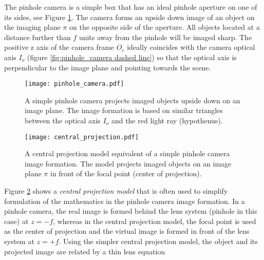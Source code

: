 \documentclass[12pt,a4paper,oneside,pdftex]{report}
\begin{document}
{%

The pinhole camera is a simple box that has an ideal pinhole aperture on one of its sides, see Figure \ref{fig:pinhole_camera}. The camera forms an upside down image of an object on the imaging plane $\pi$ on the opposite side of the aperture. All objects located at a distance further than $f$ units away from the pinhole will be imaged sharp. The positive z axis of the camera frame $O_c$ ideally coincides with the camera optical axis $I_o$ (figure \ref{fig:pinhole_camera dashed line}) so that the optical axis is perpendicular to the image plane and pointing towards the scene. 

\begin{figure}[ht]
  \begin{center}
    \texttt{[image: pinhole\_camera.pdf]}
    \caption{A simple pinhole camera projects imaged objects upside down on an image plane. The image formation is based on similar triangles between the optical axis $I_o$ and the red light ray (hypothenus).}
    \label{fig:pinhole_camera}
  \end{center}
\end{figure}

\begin{figure}[ht]
  \begin{center}
    \texttt{[image: central\_projection.pdf]}
    \caption{A central projection model equivalent of a simple pinhole camera image formation. The model projects imaged objects on an image plane $\pi$ in front of the focal point (center of projection).}
    \label{fig:central_projection}
  \end{center}
\end{figure}

Figure \ref{fig:central_projection} shows a \emph{central projection model} that is often used to simplify formulation of the mathematics in the pinhole camera image formation. In a pinhole camera, the real image is formed behind the lens system (pinhole in this case) at $z = -f$, whereas in the central projection model, the focal point is used as the center of projection and the virtual image is formed in front of the lens system at $z = +f$. Using the simpler central projection model, the object and its projected image are related by a thin lens equation

}
\end{document}

